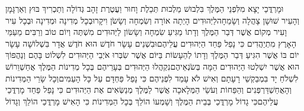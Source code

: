 \documentclass[../main/main.tex]{subfiles}
\begin{document}
\begin{multicols}{\ncols}
וּמָרְדֳּכַי יָצָא מִלִּפְנֵי הַמֶּלֶךְ בִּלְבוּשׁ מַלְכוּת תְּכֵלֶת וָחוּר וַעֲטֶרֶת זָהָב גְּדוֹלָה וְתַכְרִיךְ בּוּץ וְאַרְגָּמָן וְהָעִיר שׁוּשָׁן צָהֲלָה וְשָׂמֵחָה\PreVerseSpace{}לַיְּהוּדִים הָיְתָה אוֹרָה וְשִׂמְחָה וְשָׂשֹׂן וִיקָר\PreVerseSpace{}וּבְכָל מְדִינָה וּמְדִינָה וּבְכָל עִיר וָעִיר מְקוֹם אֲשֶׁר דְּבַר הַמֶּלֶךְ וְדָתוֹ מַגִּיעַ שִׂמְחָה וְשָׂשׂוֹן לַיְּהוּדִים מִשְׁתֶּה וְיוֹם טוֹב וְרַבִּים מֵעַמֵּי הָאָרֶץ מִתְיַהֲדִים כִּי נָפַל פַּחַד הַיְּהוּדִים עֲלֵיהֶם\PreChapterSpace{}וּבִשְׁנֵים עָשָׂר חֹדֶשׁ הוּא חֹדֶשׁ אֲדָר בִּשְׁלוֹשָׁה עָשָׂר יוֹם בּוֹ אֲשֶׁר הִגִּיעַ דְּבַר הַמֶּלֶךְ וְדָתוֹ לְהֵעָשׂוֹת בַּיּוֹם אֲשֶׁר שִׂבְּרוּ אֹיְבֵי הַיְּהוּדִים לִשְׁלוֹט בָּהֶם וְנַהֲפוֹךְ הוּא אֲשֶׁר יִשְׁלְטוּ הַיְּהוּדִים הֵמָּה בְּשֹׂנְאֵיהֶם\PreVerseSpace{}נִקְהֲלוּ הַיְּהוּדִים בְּעָרֵיהֶם בְּכָל מְדִינוֹת הַמֶּלֶךְ אֲחַשְׁוֵרוֹשׁ לִשְׁלֹחַ יָד בִּמְבַקְשֵׁי רָעָתָם וְאִישׁ לֹא עָמַד לִפְנֵיהֶם כִּי נָפַל פַּחְדָּם עַל כָּל הָעַמִּים\PreVerseSpace{}וְכָל שָׂרֵי הַמְּדִינוֹת וְהָאֲחַשְׁדַּרְפְּנִים וְהַפַּחוֹת וְעֹשֵׂי הַמְּלָאכָה אֲשֶׁר לַמֶּלֶךְ מְנַשְּׂאִים אֶת הַיְּהוּדִים כִּי נָפַל פַּחַד מָרְדֳּכַי עֲלֵיהֶם\PreVerseSpace{}כִּי גָדוֹל מָרְדֳּכַי בְּבֵית הַמֶּלֶךְ וְשָׁמְעוֹ הוֹלֵךְ בְּכָל הַמְּדִינוֹת כִּי הָאִישׁ מָרְדֳּכַי הוֹלֵךְ וְגָדוֹל\OpenSection{}\par

\end{multicols}
\end{document}
